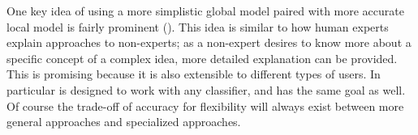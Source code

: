 One key idea of using a more simplistic global model paired with more accurate local model is fairly prominent (\cite{Ruping2006-xj,Ribeiro2016-uc,Otte2013-oo}). This idea is similar to how human experts explain approaches to non-experts; as a non-expert desires to know more about a specific concept of a complex idea, more detailed explanation can be provided. This is promising because it is also extensible to different types of users. In particular \cite{Ribeiro2016-uc} is designed to work with any classifier, and \cite{Zhang2014-he} has the same goal as well. Of course the trade-off of accuracy for flexibility will always exist between more general approaches and specialized approaches.


